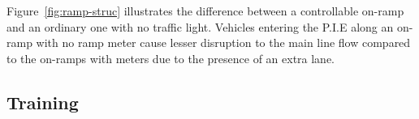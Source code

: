 \documentclass[conference]{IEEEtran}
\begin{document}
Figure~\ref{fig:ramp-struc} illustrates the difference between a controllable on-ramp and an ordinary one with no traffic light. Vehicles entering the P.I.E along an on-ramp with no ramp meter cause lesser disruption to the main line flow compared to the on-ramps with meters due to the presence of an extra lane.




\subsection{Training}
\label{subsec:training}

\end{document}
